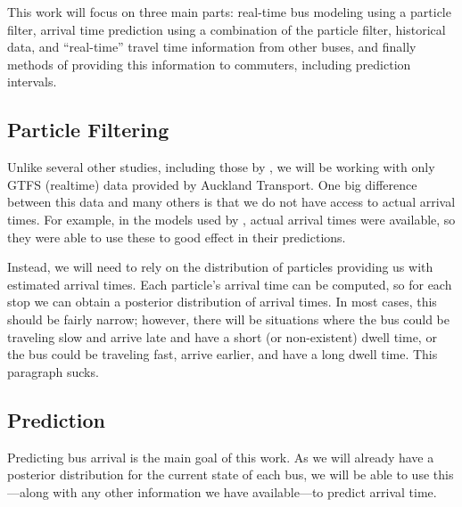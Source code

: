 \documentclass[12pt,a4paper]{article}
\begin{document}





This work will focus on three main parts:
real-time bus modeling using a particle filter,
arrival time prediction using a combination of the particle filter,
historical data, and ``real-time'' travel time information
from other buses,
and finally methods of providing this information to commuters,
including prediction intervals.


\subsection{Particle Filtering}
\label{sec:new-pf}

Unlike several other studies, including those by \cite{hans-etal:2015},
we will be working with only GTFS (realtime) data provided by Auckland Transport.
One big difference between this data and many others is that we do not have
access to actual arrival times.
For example, in the models used by \cite{hans-etal:2015},
actual arrival times were available, so they were able to use these to 
good effect in their predictions.


Instead, we will need to rely on the distribution of particles providing us
with estimated arrival times.
Each particle's arrival time can be computed, so for each stop we can obtain 
a posterior distribution of arrival times.
In most cases, this should be fairly narrow;
however, there will be situations where the bus could be traveling slow and arrive
late and have a short (or non-existent) dwell time,
or the bus could be traveling fast, arrive earlier,
and have a long dwell time.
This paragraph sucks.







\subsection{Prediction}
\label{sec:new-prediction}


Predicting bus arrival is the main goal of this work.
As we will already have a posterior distribution for the current state of
each bus, 
we will be able to use this---along with any other information we
have available---to predict arrival time.
\end{document}
